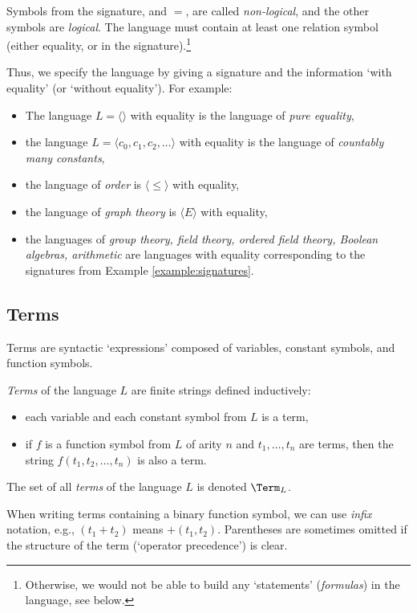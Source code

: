 Symbols from the signature, and $=$, are called \emph{non-logical}, and the other symbols are \emph{logical}. The language must contain at least one relation symbol (either equality, or in the signature).\footnote{Otherwise, we would not be able to build any `statements' (\emph{formulas}) in the language, see below.}

Thus, we specify the language by giving a signature and the information `with equality' (or `without equality'). For example:
\begin{itemize}
    \item The language $L=\langle\rangle$ with equality is the language of \emph{pure equality},
    \item the language $L=\langle c_0,c_1,c_2,\dots\rangle$ with equality is the language of \emph{countably many constants},
    \item the language of \emph{order} is $\langle \leq \rangle$ with equality,
    \item the language of \emph{graph theory} is $\langle E \rangle$ with equality,
    \item the languages of \emph{group theory, field theory, ordered field theory, Boolean algebras, arithmetic} are languages with equality corresponding to the signatures from Example \ref{example:signatures}.
\end{itemize}


\subsection{Terms}

Terms are syntactic `expressions' composed of variables, constant symbols, and function symbols.

\begin{definition}[Terms]
    \emph{Terms} of the language $L$ are finite strings defined inductively:
    \begin{itemize}
        \item each variable and each constant symbol from $L$ is a term,
        \item if $f$ is a function symbol from $L$ of arity $n$ and $t_1,\dots,t_n$ are terms, then the string $f(t_1,t_2,\dots,t_n)$ is also a term.
    \end{itemize}
    The set of all \emph{terms} of the language $L$ is denoted $\Term_L$.
\end{definition}

When writing terms containing a binary function symbol, we can use \emph{infix} notation, e.g., $(t_1+t_2)$ means $+(t_1,t_2)$. Parentheses are sometimes omitted if the structure of the term (`operator precedence') is clear.


